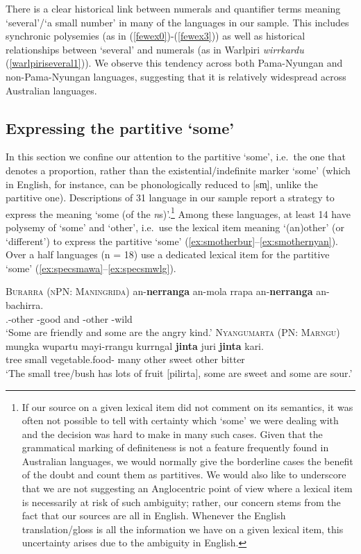 \documentclass[12pt,egregdoesnotlikesansseriftitles]{scrartcl}
\begin{document}
There is a clear historical link between numerals and quantifier terms meaning `several'/`a small number' in many of the languages in our sample. This includes synchronic polysemies (as in (\ref{fewex0})-(\ref{fewex3})) as well as historical relationships between `several' and numerals (as in Warlpiri \textit{wirrkardu} (\ref{warlpiriseveral1})). We observe this tendency across both Pama-Nyungan and non-Pama-Nyungan languages, suggesting that it is relatively widespread across Australian languages.

\subsection{Expressing the partitive `some'}
\label{sec:some}
In this section we confine our attention to the partitive `some', i.e.\ the one that denotes a proportion, rather than the existential/indefinite marker `some' (which in English, for instance, can be phonologically reduced to [{\charis sm̩}], unlike the partitive one). Descriptions of 31 language in our sample report a strategy to express the meaning `some (of the \textit{n}s)'.\footnote{If our source on a given lexical item did not comment on its semantics, it was often not possible to tell with certainty which `some' we were dealing with and the decision was hard to make in many such cases. Given that the grammatical marking of definiteness is not a feature frequently found in Australian languages, we would normally give the borderline cases the benefit of the doubt and count them as partitives. We would also like to underscore that we are not suggesting an Anglocentric point of view where a lexical item is necessarily at risk of such ambiguity; rather, our concern stems from the fact that our sources are all in English. Whenever the English translation/gloss is all the information we have on a given lexical item, this uncertainty arises due to the ambiguity in English.} %
Among these languages, at least 14 have polysemy of `some' and `other', i.e.\ use the lexical item meaning `(an)other' (or `different') to express the partitive `some' (\ref{ex:smotherbur}--\ref{ex:smothernyan}). Over a half languages (n = 18) use a dedicated lexical item for the partitive `some' (\ref{ex:specsmawa}--\ref{ex:specsmwlg}).
\begin{exe}
  \ex\label{ex:smotherbur} \textsc{Burarra (nPN: Maningrida)}\hfill {}
  \gll an-\textbf{nerranga} an-mola  rrapa  an-\textbf{nerranga}  an-bachirra.\\
  \Third.\Min-other \Third\Min-good and \Third\Min-other \Third\Min-wild\\
  \glt `Some are friendly and some are the angry kind.'
  \ex\label{ex:smothernyan} \textsc{Nyangumarta (PN: Marngu)}\hfill {}
  \gll mungka wupartu mayi-rrangu kurrngal \textbf{jinta} juri \textbf{jinta} kari.\\
  tree  small vegetable.food-\Pl{} many other sweet other bitter\\
  \glt `The small tree/bush has lots of fruit [pilirta], some are sweet and some are sour.'
\end{exe}
\end{document}
